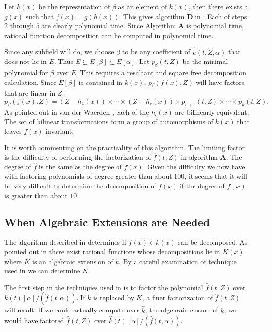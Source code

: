 Let $h(x)$ be the representation of $\beta$ as an element of $k(x)$,
then there exists a $g(x)$ such that $f(x) = g(h(x))$.  This gives
algorithm {\bf D} in .  Each of steps $2$ through $5$
are clearly polynomial time.  Since Algorithm {\bf A} is polynomial
time, rational function decomposition can be computed in polynomial
time.

Since any subfield will do, we choose $\beta$ to be any coefficient of
$\hat{h}(t, Z, \alpha)$ that does not lie in $E$.  Thus $E
\varsubsetneq E[\beta] \varsubsetneq E[\alpha]$.  Let $p_{\beta}(t, Z)$
be the minimal polynomial for $\beta$ over $E$.  This requires a
resultant and square free decomposition calculation.  Since $E[\beta]$
is contained in $k(x)$, $p_{\beta}(f(x), Z)$ will have factors that are
linear in $Z$:
\[
p_{\beta}(f(x), Z) = (Z - h_1(x)) \times \cdots \times (Z - h_r(x)) \times 
  p_{r+1}(t, Z) \times \cdots \times p_{k}(t, Z).
\]
As pointed out in van der Waerden \cite{Waerden:Algebra}, each of
the $h_i(x)$ are bilinearly equivalent.  The set of bilinear
transformations form a group of automorphisms of $k(x)$ that leaves
$f(x)$ invariant.

\medskip
It is worth commenting on the practicality of this algorithm.  The
limiting factor is the difficulty of performing the factorization of
$\hat{f}(t, Z)$ in algorithm {\bf A}.  The degree of $\hat{f}$ is the
same as the degree of $f(x)$.  Given the difficulty we now have with
factoring polynomials of degree greater than about $100$, it seems
that it will be very difficult to determine the decomposition of
$f(x)$ if the degree of $f(x)$ is greater than about $10$.


\subsection{When Algebraic Extensions are Needed}
\label{AE:Needed:Sec}

The algorithm described in  determines if $f(x)
\in k(x)$ can be decomposed.  As pointed out in
 there exist rational functions whose
decompositions lie in $K(x)$ where $K$ is an algebraic extension of
$k$.  By a careful examination of technique used in
 we can determine $K$.

The first step in the techniques used in  is to
factor the polynomial $\hat{f}(t, Z)$ over $k(t)[\alpha]/(\hat{f}(t,
\alpha))$.  If $k$ is replaced by $K$, a finer factorization of
$\hat{f}(t, Z)$ will result.  If we could actually compute over
$\hat{k}$, the algebraic closure of $k$, we would have factored
$\hat{f}(t, Z)$ over $\hat{k}(t)[\alpha]/(\hat{f}(t, \alpha))$.  


